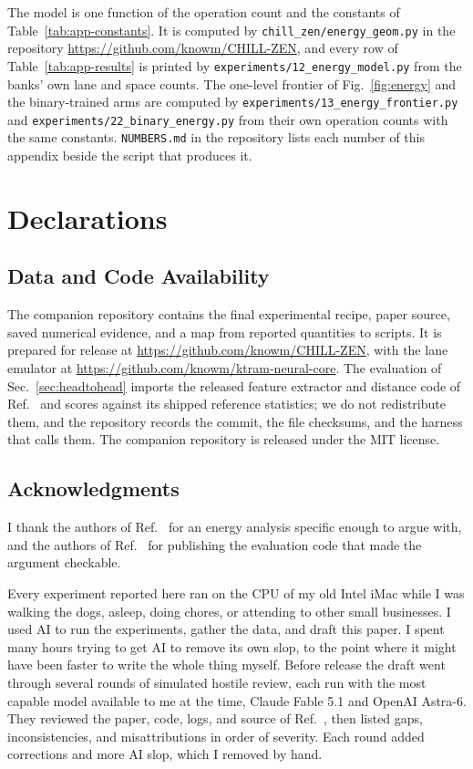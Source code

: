 \documentclass[reprint,amsmath,amssymb,aps,nofootinbib]{revtex4-2}
\begin{document}
The model is one function of the operation count and the constants of
Table~\ref{tab:app-constants}. It is computed by
\texttt{chill\_zen/energy\_geom.py} in the repository
\url{https://github.com/knowm/CHILL-ZEN}, and every row of
Table~\ref{tab:app-results} is printed by
\texttt{experiments/12\_energy\_model.py} from the banks' own lane and
space counts. The one-level frontier of Fig.~\ref{fig:energy} and the binary-trained
arms are computed by \texttt{experiments/13\_energy\_frontier.py} and
\texttt{experiments/22\_binary\_energy.py} from their own operation counts with
the same constants. \texttt{NUMBERS.md} in the repository lists each
number of this appendix beside the script that produces it.

\section*{Declarations}

\subsection*{Data and Code Availability}

The companion repository contains the final experimental recipe,
paper source, saved numerical evidence, and a map from reported
quantities to scripts. It is prepared for release at \url{https://github.com/knowm/CHILL-ZEN}, with the
lane emulator at \url{https://github.com/knowm/ktram-neural-core}.
The evaluation of Sec.~\ref{sec:headtohead} imports the released
feature extractor and distance code of Ref.~\cite{dtmreplication} and
scores against its shipped reference statistics; we do not
redistribute them, and the repository records
the commit, the file checksums, and the harness that calls them. The
companion repository is released under the MIT license.

\subsection*{Acknowledgments}

I thank the authors of Ref.~\cite{jelincic2025dtm} for an energy
analysis specific enough to argue with, and the authors of
Ref.~\cite{dtmreplication} for publishing the evaluation code that
made the argument checkable.

Every experiment reported here ran on the CPU of my old Intel iMac while I was walking the dogs, asleep, doing
chores, or attending to other small businesses. I used AI to run the experiments, gather the data, and draft this
paper. I spent many
hours trying to get AI to remove its own slop, to the point where it
might have been faster to write the whole thing myself. Before release the draft went through several rounds of
simulated hostile review, each run with the most capable model
available to me at the time, Claude Fable 5.1 and OpenAI Astra-6. They reviewed the paper, code, logs, and source of
Ref.~\cite{jelincic2025dtm}, then listed gaps, inconsistencies, and
misattributions in order of severity. Each round added corrections and more AI slop, which I removed by hand. 
\end{document}
